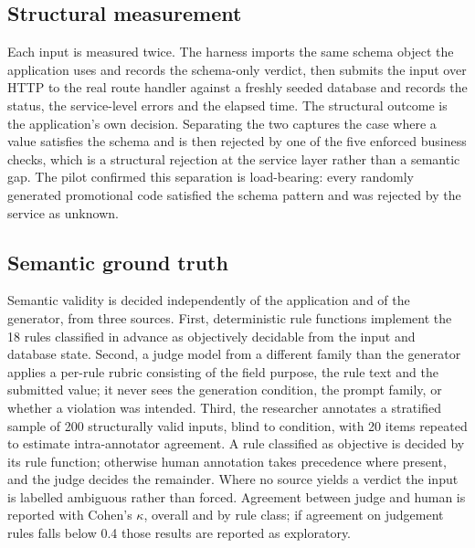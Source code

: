 \documentclass[conference]{IEEEtran}
\begin{document}
\subsection{Structural measurement}
Each input is measured twice. The harness imports the same schema object the application uses and
records the schema-only verdict, then submits the input over HTTP to the real route handler against a
freshly seeded database and records the status, the service-level errors and the elapsed time. The
structural outcome is the application's own decision. Separating the two captures the case where a
value satisfies the schema and is then rejected by one of the five enforced business checks, which is
a structural rejection at the service layer rather than a semantic gap. The pilot confirmed this
separation is load-bearing: every randomly generated promotional code satisfied the schema pattern
and was rejected by the service as unknown.

\subsection{Semantic ground truth}
Semantic validity is decided independently of the application and of the generator, from three
sources. First, deterministic rule functions implement the 18 rules classified in advance as
objectively decidable from the input and database state. Second, a judge model from a different
family than the generator applies a per-rule rubric consisting of the field purpose, the rule text and
the submitted value; it never sees the generation condition, the prompt family, or whether a
violation was intended. Third, the researcher annotates a stratified sample of 200 structurally valid
inputs, blind to condition, with 20 items repeated to estimate intra-annotator agreement. A rule
classified as objective is decided by its rule function; otherwise human annotation takes precedence
where present, and the judge decides the remainder. Where no source yields a verdict the input is
labelled ambiguous rather than forced. Agreement between judge and human is reported with Cohen's
$\kappa$, overall and by rule class; if agreement on judgement rules falls below 0.4 those results
are reported as exploratory.
\end{document}
